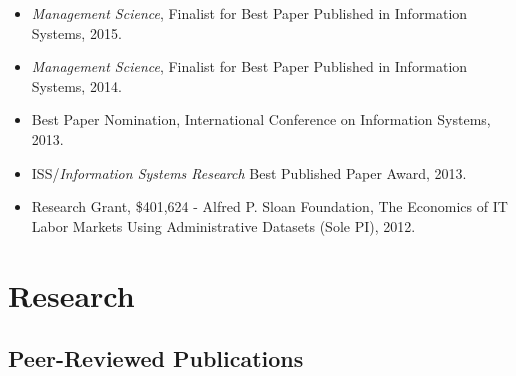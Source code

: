 \documentclass[10pt,letterpaper]{article}
\begin{document}
\begin{itemize}
\item \textit{Management Science}, Finalist for Best Paper Published in Information Systems, 2015.
\item \textit{Management Science}, Finalist for Best Paper Published in Information Systems, 2014.
\item Best Paper Nomination, International Conference on Information Systems, 2013.
\item ISS/\textit{Information Systems Research} Best Published Paper Award, 2013.
\item Research Grant, \$401,624 - Alfred P. Sloan Foundation, The Economics of 
IT Labor Markets Using Administrative Datasets (Sole PI), 2012.
\end{itemize}

\section*{Research}

\subsection*{Peer-Reviewed Publications}
\end{document}

